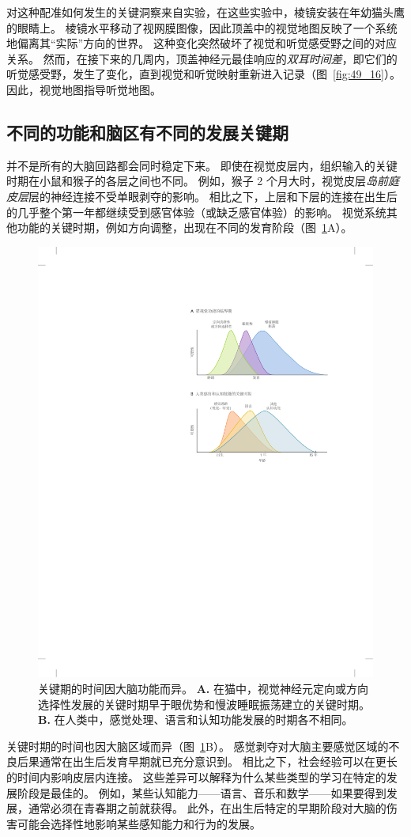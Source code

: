 对这种配准如何发生的关键洞察来自实验，在这些实验中，棱镜安装在年幼猫头鹰的眼睛上。
棱镜水平移动了视网膜图像，因此顶盖中的视觉地图反映了一个系统地偏离其“实际”方向的世界。
这种变化突然破坏了视觉和听觉感受野之间的对应关系。
然而，在接下来的几周内，顶盖神经元最佳响应的\textit{双耳时间差}，即它们的听觉感受野，发生了变化，直到视觉和听觉映射重新进入记录（图~\ref{fig:49_16}）。
因此，视觉地图指导听觉地图。



\subsection{不同的功能和脑区有不同的发展关键期}

并不是所有的大脑回路都会同时稳定下来。
即使在视觉皮层内，组织输入的关键时期在小鼠和猴子的各层之间也不同。
例如，猴子 2 个月大时，视觉皮层\textit{岛前庭皮层}层的神经连接不受单眼剥夺的影响。
相比之下，上层和下层的连接在出生后的几乎整个第一年都继续受到感官体验（或缺乏感官体验）的影响。
视觉系统其他功能的关键时期，例如方向调整，出现在不同的发育阶段（图~\ref{fig:49_18}A）。


\begin{figure}[htbp]
	\centering
	\includegraphics[width=0.6\linewidth]{chap49/fig_49_18}
	\caption{关键期的时间因大脑功能而异。
		\textbf{A.} 在猫中，视觉神经元定向或方向选择性发展的关键时期早于眼优势和慢波睡眠振荡建立的关键时期。 \textbf{B.} 在人类中，感觉处理、语言和认知功能发展的时期各不相同。}
	\label{fig:49_18}
\end{figure}


关键时期的时间也因大脑区域而异（图~\ref{fig:49_18}B）。
感觉剥夺对大脑主要感觉区域的不良后果通常在出生后发育早期就已充分意识到。
相比之下，社会经验可以在更长的时间内影响皮层内连接。
这些差异可以解释为什么某些类型的学习在特定的发展阶段是最佳的。
例如，某些认知能力——语言、音乐和数学——如果要得到发展，通常必须在青春期之前就获得。
此外，在出生后特定的早期阶段对大脑的伤害可能会选择性地影响某些感知能力和行为的发展。




